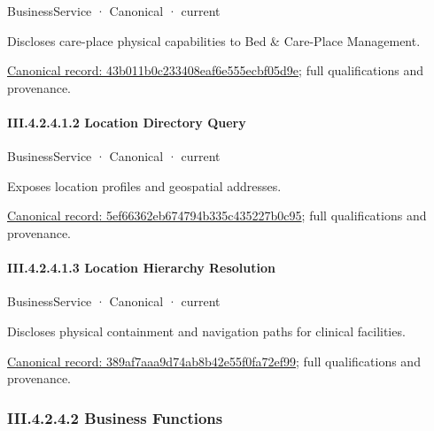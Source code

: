 \label{element:43b011b0c233408eaf6e555ecbf05d9e}
{\small BusinessService · Canonical · current}\par

Discloses care-place physical capabilities to Bed \& Care-Place Management.


{\footnotesize \href{../../../../../../../continuum/business/business-service/43b011b0c233408eaf6e555ecbf05d9e.md}{Canonical record: 43b011b0c233408eaf6e555ecbf05d9e}; full qualifications and provenance.}\par
\paragraph*{III.4.2.4.1.2 Location Directory Query}
\label{navigation:III.4.2.4.1.2}

\label{element:5ef66362eb674794b335c435227b0c95}
{\small BusinessService · Canonical · current}\par

Exposes location profiles and geospatial addresses.


{\footnotesize \href{../../../../../../../continuum/business/business-service/5ef66362eb674794b335c435227b0c95.md}{Canonical record: 5ef66362eb674794b335c435227b0c95}; full qualifications and provenance.}\par
\paragraph*{III.4.2.4.1.3 Location Hierarchy Resolution}
\label{navigation:III.4.2.4.1.3}

\label{element:389af7aaa9d74ab8b42e55f0fa72ef99}
{\small BusinessService · Canonical · current}\par

Discloses physical containment and navigation paths for clinical facilities.


{\footnotesize \href{../../../../../../../continuum/business/business-service/389af7aaa9d74ab8b42e55f0fa72ef99.md}{Canonical record: 389af7aaa9d74ab8b42e55f0fa72ef99}; full qualifications and provenance.}\par
\subsubsection*{III.4.2.4.2 Business Functions}
\label{navigation:III.4.2.4.2}

